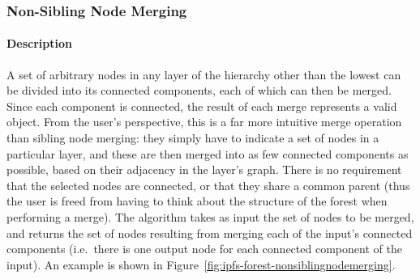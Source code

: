 \subsubsection{Non-Sibling Node Merging}

\paragraph{Description}

A set of arbitrary nodes in any layer of the hierarchy other than the lowest can be divided into its connected components, each of which can then be merged. Since each component is connected, the result of each merge represents a valid object. From the user's perspective, this is a far more intuitive merge operation than sibling node merging: they simply have to indicate a set of nodes in a particular layer, and these are then merged into as few connected components as possible, based on their adjacency in the layer's graph. There is no requirement that the selected nodes are connected, or that they share a common parent (thus the user is freed from having to think about the structure of the forest when performing a merge). The algorithm takes as input the set of nodes to be merged, and returns the set of nodes resulting from merging each of the input's connected components (i.e.~there is one output node for each connected component of the input). An example is shown in Figure~\ref{fig:ipfs-forest-nonsiblingnodemerging}.

